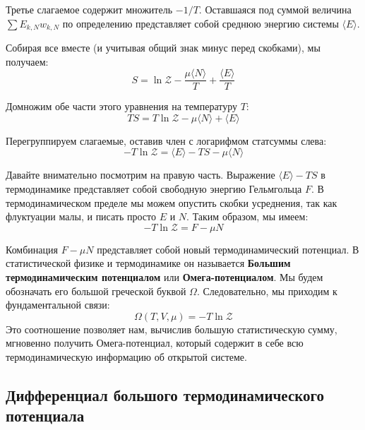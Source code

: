 \documentclass[../general/general]{subfiles}
\begin{document}
Третье слагаемое содержит множитель $-1/T$. Оставшаяся под суммой величина $\sum E_{k, N} w_{k, N}$ по определению представляет собой среднюю энергию системы $\langle E \rangle$.

Собирая все вместе (и учитывая общий знак минус перед скобками), мы получаем:
\begin{equation*}
    S = \ln \mathcal{Z} - \frac{\mu \langle N \rangle}{T} + \frac{\langle E \rangle}{T}
\end{equation*}

Домножим обе части этого уравнения на температуру $T$:
\begin{equation*}
    TS = T \ln \mathcal{Z} - \mu \langle N \rangle + \langle E \rangle
\end{equation*}

Перегруппируем слагаемые, оставив член с логарифмом статсуммы слева:
\begin{equation*}
    -T \ln \mathcal{Z} = \langle E \rangle - TS - \mu \langle N \rangle
\end{equation*}

Давайте внимательно посмотрим на правую часть. Выражение $\langle E \rangle - TS$ в термодинамике представляет собой свободную энергию Гельмгольца $F$. В термодинамическом пределе мы можем опустить скобки усреднения, так как флуктуации малы, и писать просто $E$ и $N$. Таким образом, мы имеем:
\begin{equation*}
    -T \ln \mathcal{Z} = F - \mu N
\end{equation*}

Комбинация $F - \mu N$ представляет собой новый термодинамический потенциал. В статистической физике и термодинамике он называется \textbf{Большим термодинамическим потенциалом} или \textbf{Омега-потенциалом}. Мы будем обозначать его большой греческой буквой $\Omega$. Следовательно, мы приходим к фундаментальной связи:
\begin{equation}
    \Omega(T, V, \mu) = -T \ln \mathcal{Z}
    \label{eq:omega_potential_def}
\end{equation}
Это соотношение позволяет нам, вычислив большую статистическую сумму, мгновенно получить Омега-потенциал, который содержит в себе всю термодинамическую информацию об открытой системе.

\subsection{Дифференциал большого термодинамического потенциала}
\end{document}
